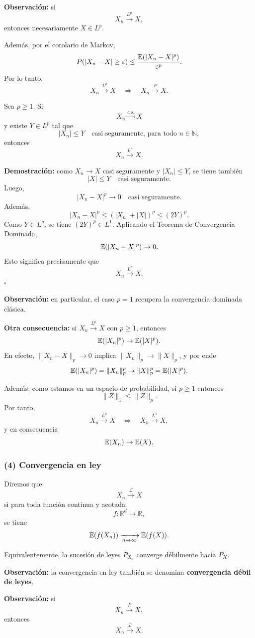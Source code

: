 \medskip

\noindent
\textbf{Observación:} si
\[
X_n\xrightarrow{L^p}X,
\]
entonces necesariamente \(X\in L^p\).

\medskip

\noindent
Además, por el corolario de Markov,
\[
P(|X_n-X|\geq \varepsilon)
\leq
\frac{\mathbb{E}(|X_n-X|^p)}{\varepsilon^p}.
\]
Por lo tanto,
\[
X_n\xrightarrow{L^p}X
\quad\Longrightarrow\quad
X_n\xrightarrow{P}X.
\]

\begin{teo}
Sea \(p\geq 1\). Si
\[
X_n\xrightarrow{c.s.}X
\]
y existe \(Y\in L^p\) tal que
\[
|X_n|\leq Y
\quad \text{casi seguramente, para todo } n\in\mathbb{N},
\]
entonces
\[
X_n\xrightarrow{L^p}X.
\]
\end{teo}

\textbf{Demostración:} como \(X_n\to X\) casi seguramente y \(|X_n|\leq Y\), se tiene también
\[
|X|\leq Y
\quad \text{casi seguramente}.
\]
Luego,
\[
|X_n-X|^p\to 0
\quad \text{casi seguramente}.
\]
Además,
\[
|X_n-X|^p \leq (|X_n|+|X|)^p \leq (2Y)^p.
\]
Como \(Y\in L^p\), se tiene \((2Y)^p\in L^1\). Aplicando el Teorema de Convergencia Dominada,
\[
\mathbb{E}(|X_n-X|^p)\to 0.
\]
Esto significa precisamente que
\[
X_n\xrightarrow{L^p}X.
\]
\hfill \(\square\)

\medskip

\noindent
\textbf{Observación:} en particular, el caso \(p=1\) recupera la convergencia dominada clásica.

\medskip

\noindent
\textbf{Otra consecuencia:} si \(X_n\xrightarrow{L^p}X\) con \(p\geq 1\), entonces
\[
\mathbb{E}(|X_n|^p)\to \mathbb{E}(|X|^p).
\]
En efecto, \(\|X_n-X\|_p\to 0\) implica \(\|X_n\|_p\to \|X\|_p\), y por ende
\[
\mathbb{E}(|X_n|^p)=\|X_n\|_p^p \to \|X\|_p^p=\mathbb{E}(|X|^p).
\]

\medskip

\noindent
Además, como estamos en un espacio de probabilidad, si \(p\geq 1\) entonces
\[
\|Z\|_1\leq \|Z\|_p.
\]
Por tanto,
\[
X_n\xrightarrow{L^p}X
\quad\Longrightarrow\quad
X_n\xrightarrow{L^1}X,
\]
y en consecuencia
\[
\mathbb{E}(X_n)\to \mathbb{E}(X).
\]

\subsubsection*{(4) Convergencia en ley}

Diremos que
\[
X_n\xrightarrow{\mathcal{L}}X
\]
si para toda función continua y acotada
\[
f:\mathbb{R}^d\to\mathbb{R},
\]
se tiene
\[
\mathbb{E}(f(X_n))\xrightarrow[n\to\infty]{}\mathbb{E}(f(X)).
\]

Equivalentemente, la sucesión de leyes \(P_{X_n}\) converge débilmente hacia \(P_X\).

\medskip

\noindent
\textbf{Observación:} la convergencia en ley también se denomina \textbf{convergencia débil de leyes}.

\medskip

\noindent
\textbf{Observación:} si
\[
X_n\xrightarrow{P}X,
\]
entonces
\[
X_n\xrightarrow{\mathcal{L}}X.
\]